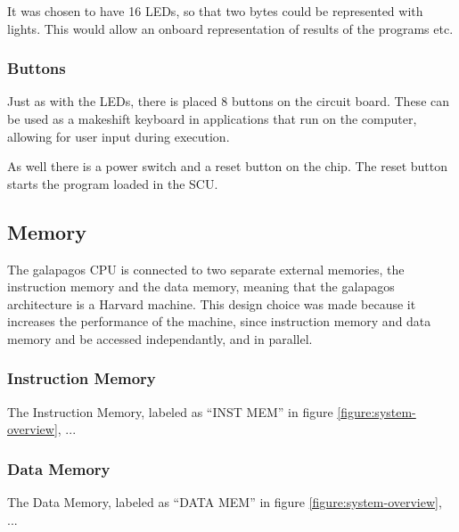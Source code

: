 It was chosen to have 16 LEDs, so that two bytes could be represented with lights. This would allow an onboard representation of results of the programs etc.

\subsubsection{Buttons}

Just as with the LEDs, there is placed 8 buttons on the circuit board. These can be used as a makeshift keyboard in applications that run on the computer, allowing for user input during execution.

As well there is a power switch and a reset  button on the chip. The reset button starts the program loaded in the SCU.


\subsection{Memory}

The \Gls{galapagos} CPU is connected to two separate external memories, the instruction memory and the data memory, meaning that the \Gls{galapagos} architecture is a Harvard machine.
This design choice was made because it increases the performance of the machine, since instruction memory and data memory and be accessed independantly, and in parallel. 

\subsubsection{Instruction Memory}

The Instruction Memory, labeled as ``INST MEM'' in figure \vref{figure:system-overview}, ...

\subsubsection{Data Memory}

The Data Memory, labeled as ``DATA MEM'' in figure \vref{figure:system-overview}, ...

